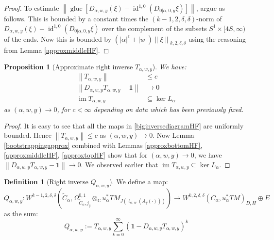 \documentclass[12pt]{article}
\newtheorem{proposition}[theorem]{Proposition}
\theoremstyle{definition}
\newtheorem{definition}[theorem]{Definition}
\theoremstyle{remark}
\numberwithin{equation}{subsection}
\newcommand{\CC}{\mathbb C}
\newcommand{\im}{\operatorname{im}}
\newcommand{\id}{\operatorname{id}}
\begin{document}
\begin{proof}
To estimate $\left\|\operatorname{glue}\left[D_{\alpha,w,y}(\xi)-\id^{1,0}(D_{0|\alpha,0,y}\xi)\right]\right\|$, argue as follows.  This is bounded by a constant times the $(k-1,2,\delta,\delta)$-norm of $D_{\alpha,w,y}(\xi)-\id^{1,0}(D_{0|\alpha,0,y}\xi)$ over the complement of the subsets $S^1\times[4S,\infty)$ of the ends.  Now this is bounded by $(\left|\alpha\right|^\epsilon+\left|w\right|)\left\|\xi\right\|_{k,2,\delta,\delta}$ using the reasoning from Lemma \ref{approxmiddleHF}.
\end{proof}

\begin{proposition}[Approximate right inverse $T_{\alpha,w,y}$]\label{approxworksHF}
We have:
\begin{align}
\left\|T_{\alpha,w,y}\right\|&\leq c\\
\label{TapproxeqnHF}\left\|D_{\alpha,w,y} T_{\alpha,w,y}-\mathbf 1\right\|&\to 0\\
\im T_{\alpha,w,y}&\subseteq\ker L_\alpha
\end{align}
as $(\alpha,w,y)\to 0$, for $c<\infty$ depending on data which has been previously fixed.
\end{proposition}

\begin{proof}
It is easy to see that all the maps in \eqref{biginversediagramHF} are uniformly bounded.  Hence $\left\|T_{\alpha,w,y}\right\|\leq c$ as $(\alpha,w,y)\to 0$.  Now Lemma \ref{bootstrappingapprox} combined with Lemmas \ref{approxbottomHF}, \ref{approxmiddleHF}, \ref{approxtopHF} show that for $(\alpha,w,y)\to 0$, we have $\left\|D_{\alpha,w,y} T_{\alpha,w,y}-\mathbf 1\right\|\to 0$.  We observed earlier that $\im T_{\alpha,w,y}\subseteq\ker L_\alpha$.
\end{proof}

\begin{definition}[Right inverse $Q_{\alpha,w,y}$]
We define a map:
\begin{equation}
Q_{\alpha,w,y}:W^{k-1,2,\delta,\delta}(\tilde C_\alpha,\Omega^{0,1}_{\tilde C_\alpha,j_y}\otimes_\CC u_\alpha^\ast TM_{J(\ell_{\alpha,w}(A_y(\cdot)))})\to W^{k,2,\delta,\delta}(C_\alpha,u_\alpha^\ast TM)_{D,H}\oplus E
\end{equation}
as the sum:
\begin{equation}
Q_{\alpha,w,y}:=T_{\alpha,w,y}\sum_{k=0}^\infty(\mathbf 1-D_{\alpha,w,y}T_{\alpha,w,y})^k
\end{equation}
\end{definition}
\end{document}
